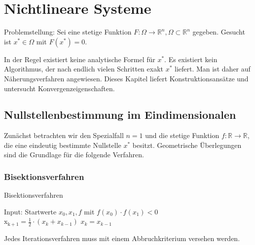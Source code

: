 \section{Nichtlineare Systeme}

Problemstellung: Sei eine stetige Funktion
$F: \Omega \longrightarrow \mathbb{R}^n, \Omega \subset \mathbb{R}^n$ gegeben.
Gesucht ist $x^*\in \Omega$ mit $F(x^*)=0$.
\newline

\begin{bemerkung}
In der Regel existiert keine analytische Formel für $x^*$.
Es existiert kein Algorithmus, der nach endlich vielen Schritten exakt $x^*$
liefert.  Man ist daher auf Näherungsverfahren angewiesen.  Dieses Kapitel
liefert Konstruktionsansätze und untersucht Konvergenzeigenschaften.
\end{bemerkung}

\subsection{Nullstellenbestimmung im Eindimensionalen}

Zunächst betrachten wir den Spezialfall $n=1$ und die stetige Funktion $f:
\mathbb{R} \longrightarrow \mathbb{R}$, die eine eindeutig bestimmte Nullstelle
$x^*$ besitzt. Geometrische Überlegungen sind die Grundlage für die folgende
Verfahren.


\subsubsection{Bisektionsverfahren}

\begin{algorithm}
\caption{Bisektionsverfahren}
\begin{algorithmic}
\STATE Input: Startwerte $x_0, x_1, f$ mit $f(x_0) \cdot f(x_1) <0$\\
  \STATE $\mathrm{x_{k+1}}= \frac{1}{2} \cdot (x_k + x_{k-1})$
    \STATE $x_k = x_{k-1}$
  \ENDIF
\ENDFOR
\end{algorithmic}
\end{algorithm}


\begin{bemerkung}
Jedes Iterationsverfahren muss mit einem Abbruchkriterium versehen werden.
\end{bemerkung}


